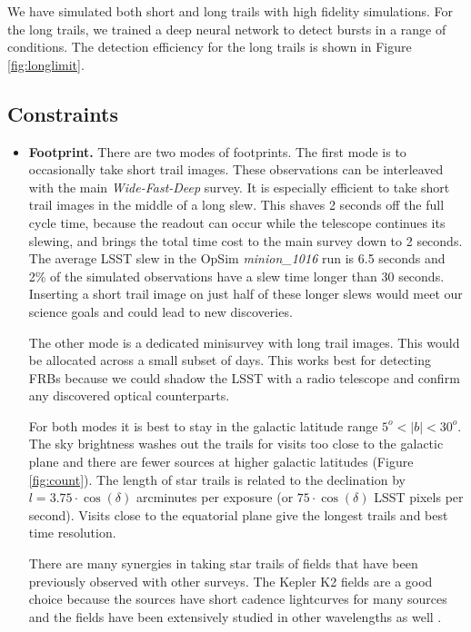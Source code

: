 \documentclass[12pt, letterpaper]{article}
\begin{document}
We have simulated both short and long trails with high fidelity simulations. For the long trails, we trained a deep neural network to detect bursts in a range of conditions. The detection efficiency for the long trails is shown in Figure \ref{fig:longlimit}. 

\subsection{Constraints}

\begin{itemize}
\item \textbf{Footprint.} There are two modes of footprints. The first mode is to occasionally take short trail images. These observations can be interleaved with the main \textit{Wide-Fast-Deep} survey. It is especially efficient to take short trail images in the middle of a long slew. This shaves 2 seconds off the full cycle time, because the readout can occur while the telescope continues its slewing, and brings the total time cost to the main survey down to 2 seconds. The average LSST slew in the OpSim \textit{minion\_1016} run is 6.5 seconds and 2\% of the simulated observations have a slew time longer than 30 seconds. Inserting a short trail image on just half of these longer slews would meet our science goals and could lead to new discoveries. 

The other mode is a dedicated minisurvey with long trail images. This would be allocated across a small subset of days. This works best for detecting FRBs because we could shadow the LSST with a radio telescope and confirm any discovered optical counterparts.

For both modes it is best to stay in the galactic latitude range $5^o < |b| < 30^o$. The sky brightness washes out the trails for visits too close to the galactic plane and there are fewer sources at higher galactic latitudes (Figure \ref{fig:count}). The length of star trails is related to the declination by $l = 3.75 \cdot \cos(\delta)$ arcminutes per exposure (or $75 \cdot \cos(\delta)$ LSST pixels per second). Visits close to the equatorial plane give the longest trails and best time resolution. 

There are many synergies in taking star trails of fields that have been previously observed with other surveys. The Kepler K2 fields \citep{2014PASP..126..398H} are a good choice because the sources have short cadence lightcurves for many sources and the fields have been extensively studied in other wavelengths as well \citep{2016HEAD...1510605S}.


\end{itemize}
\end{document}
